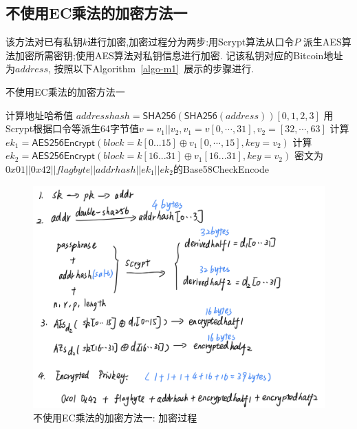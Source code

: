 \subsection{不使用EC乘法的加密方法一}

该方法对已有私钥$k$进行加密,加密过程分为两步:用Scrypt算法从口令$P$
派生AES算法加密所需密钥;使用AES算法对私钥信息进行加密.
记该私钥对应的Bitcoin地址为$address$, 按照以下Algorithm~\ref{algo-m1}~展示的步骤进行.

\begin{algorithm}[h]\footnotesize
\caption{不使用EC乘法的加密方法一}\label{algo-m1}
\begin{algorithmic}[1]
	    	\STATE 计算地址哈希值 $addresshash = \textsf{SHA256}(\textsf{SHA256}(address))[0,1,2,3]$
		\STATE 用Scrypt根据口令等派生64字节值$v=v_1||v_2, v_1 = v[0,\cdots, 31], v_2= [32,\cdots,63]$
		\STATE 计算$ek_1 = \textsf{AES256Encrypt}(block = k[0...15] \oplus v_1[0,\cdots,15], key = v_2)$
		\STATE 计算$ek_2 = \textsf{AES256Encrypt}(block = k[16...31] \oplus v_1[16...31], key = v_2)$
		\STATE 密文为$0x01 || 0x42 || flagbyte || addrhash || ek_1 || ek_2$的\textsf{Base58CheckEncode}
\end{algorithmic}
\end{algorithm}




\begin{figure}[h]
\centering
\includegraphics[width=.7\textwidth]{./no-ec.png}
\caption{不使用EC乘法的加密方法一: 加密过程}\label{fig-m1-enc}
\end{figure}

